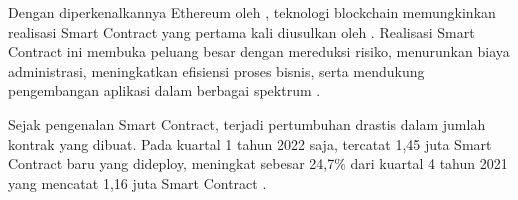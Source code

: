 
Dengan diperkenalkannya Ethereum oleh \cite{buterin2013ethereum}, teknologi blockchain memungkinkan realisasi Smart Contract yang pertama kali diusulkan oleh \cite{szabo1997formalizing}. Realisasi Smart Contract ini membuka peluang besar dengan mereduksi risiko, menurunkan biaya administrasi, meningkatkan efisiensi proses bisnis, serta mendukung pengembangan aplikasi dalam berbagai spektrum \parencite{zheng2020overview}. 

Sejak pengenalan Smart Contract, terjadi pertumbuhan drastis dalam jumlah kontrak yang dibuat. Pada kuartal 1 tahun 2022 saja, tercatat 1,45 juta Smart Contract baru yang dideploy, meningkat sebesar 24,7\% dari kuartal 4 tahun 2021 yang mencatat 1,16 juta Smart Contract \parencite{alchemy_ethereum_statistics}. 

